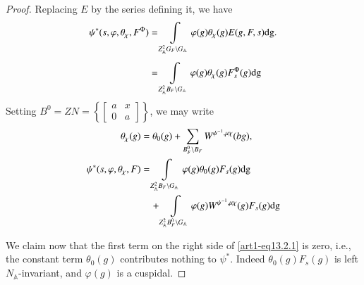 \begin{proof}
Replacing $E$ by the series defining it, we have
\begin{align*}
\psi^{*}(s,\varphi,\theta_{\chi},F^{\Phi}) &= \int\limits_{Z^{2}_{\mathbb{A}}G_{F}\backslash G_{\mathbb{A}}}\varphi(g)\theta_{\chi}(g)E(g,F,s)\mathrm{dg}.\\[4pt]
&=\int\limits_{Z^{2}_{\mathbb{A}}B_{F}\backslash G_{\mathbb{A}}}\varphi(g)\theta_{\chi}(g)F^{\Phi}_{s}(g)\mathrm{dg}
\end{align*}
Setting $B^{0}=ZN=\left\{\left[\begin{smallmatrix} a & x\\ 0 & a\end{smallmatrix}\right]\right\}$, we may write
\setcounter{subsection}{2}
\setcounter{equation}{0}
\begin{align}
\theta_{\chi}(g) &=\theta_{0}(g)+\sum\limits_{B^{0}_{F}\backslash B_{F}}W^{\psi^{-1},\mu\chi}(bg),\notag\\
\psi^{*}(s,\varphi,\theta_{\chi},F) &= \int\limits_{Z^{2}_{\mathbb{A}}B_{F}\backslash G_{\mathbb{A}}}\varphi(g)\theta_{0}(g)F_{s}(g)\mathrm{dg}\notag\\
&\quad + \int\limits_{Z^{2}_{\mathbb{A}}B^{0}_{F}\backslash G_{\mathbb{A}}}\varphi(g)W^{\psi^{-1},\mu\chi}(g)F_{s}(g)\mathrm{dg}\label{art13.2.1}
\end{align}\pageoriginale

We claim now that the first term on the right side of \eqref{art1-eq13.2.1} is zero, i.e., the constant term $\theta_{0}(g)$ contributes nothing to $\psi^{*}$. Indeed $\theta_{0}(g)F_{s}(g)$ is left $N_{\mathbb{A}}$-invariant, and $\varphi(g)$ is a cuspidal.


\end{proof}
